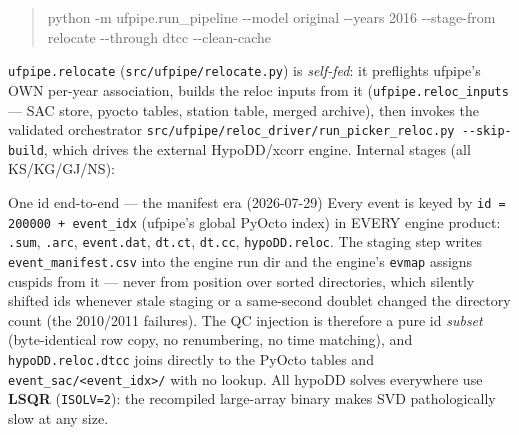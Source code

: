 \documentclass[11pt]{article}
\newcommand{\code}[1]{\texttt{#1}}
\begin{document}
\begin{quote}\ttfamily\small
python -m ufpipe.run\_pipeline -{}-model original -{}-years 2016 -{}-stage-from relocate -{}-through dtcc -{}-clean-cache
\end{quote}

\code{ufpipe.relocate} (\code{src/ufpipe/relocate.py}) is \emph{self-fed}: it preflights ufpipe's OWN per-year
association, builds the reloc inputs from it (\code{ufpipe.reloc\_inputs} --- SAC store, pyocto tables, station
table, merged archive), then invokes the validated orchestrator
\code{src/ufpipe/reloc\_driver/run\_picker\_reloc.py -{}-skip-build}, which drives the external
HypoDD/xcorr engine. Internal stages (all KS/KG/GJ/NS):

\begin{keybox}{One id end-to-end --- the manifest era (2026-07-29)}
Every event is keyed by \code{id = 200000 + event\_idx} (ufpipe's global PyOcto index) in EVERY engine product:
\code{.sum}, \code{.arc}, \code{event.dat}, \code{dt.ct}, \code{dt.cc}, \code{hypoDD.reloc}. The staging step
writes \code{event\_manifest.csv} into the engine run dir and the engine's \code{evmap} assigns cuspids from it
--- never from position over sorted directories, which silently shifted ids whenever stale staging or a
same-second doublet changed the directory count (the 2010/2011 failures). The QC injection is therefore a pure
id \emph{subset} (byte-identical row copy, no renumbering, no time matching), and \code{hypoDD.reloc.dtcc} joins
directly to the PyOcto tables and \code{event\_sac/<event\_idx>/} with no lookup. All hypoDD solves everywhere
use \textbf{LSQR} (\code{ISOLV=2}): the recompiled large-array binary makes SVD pathologically slow at any size.
\end{keybox}
\end{document}
